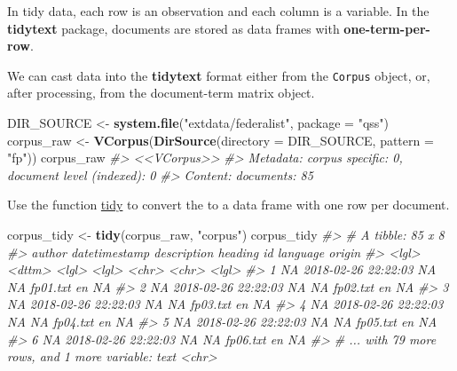 \documentclass[]{book}
\newenvironment{Shaded}{\begin{snugshade}}{\end{snugshade}}
\newcommand{\CommentTok}[1]{\textcolor[rgb]{0.56,0.35,0.01}{\textit{#1}}}
\newcommand{\DataTypeTok}[1]{\textcolor[rgb]{0.13,0.29,0.53}{#1}}
\newcommand{\KeywordTok}[1]{\textcolor[rgb]{0.13,0.29,0.53}{\textbf{#1}}}
\newcommand{\NormalTok}[1]{#1}
\newcommand{\StringTok}[1]{\textcolor[rgb]{0.31,0.60,0.02}{#1}}
\theoremstyle{definition}
\theoremstyle{definition}
\theoremstyle{definition}
\theoremstyle{remark}
\begin{document}
In tidy data, each row is an observation and each column is a variable.
In the \textbf{tidytext} package, documents are stored as data frames
with \textbf{one-term-per-row}.

We can cast data into the \textbf{tidytext} format either from the
\texttt{Corpus} object, or, after processing, from the document-term
matrix object.

\begin{Shaded}
\begin{Highlighting}[]
\NormalTok{DIR_SOURCE <-}\StringTok{ }\KeywordTok{system.file}\NormalTok{(}\StringTok{"extdata/federalist"}\NormalTok{, }\DataTypeTok{package =} \StringTok{"qss"}\NormalTok{)}
\NormalTok{corpus_raw <-}\StringTok{ }\KeywordTok{VCorpus}\NormalTok{(}\KeywordTok{DirSource}\NormalTok{(}\DataTypeTok{directory =}\NormalTok{ DIR_SOURCE, }\DataTypeTok{pattern =} \StringTok{"fp"}\NormalTok{))}
\NormalTok{corpus_raw}
\CommentTok{#> <<VCorpus>>}
\CommentTok{#> Metadata:  corpus specific: 0, document level (indexed): 0}
\CommentTok{#> Content:  documents: 85}
\end{Highlighting}
\end{Shaded}

Use the function
\href{https://www.rdocumentation.org/packages/tidyytext/topics/tidy.Corpus}{tidy}
to convert the to a data frame with one row per document.

\begin{Shaded}
\begin{Highlighting}[]
\NormalTok{corpus_tidy <-}\StringTok{ }\KeywordTok{tidy}\NormalTok{(corpus_raw, }\StringTok{"corpus"}\NormalTok{)}
\NormalTok{corpus_tidy}
\CommentTok{#> # A tibble: 85 x 8}
\CommentTok{#>   author datetimestamp       description heading id       language origin}
\CommentTok{#>   <lgl>  <dttm>              <lgl>       <lgl>   <chr>    <chr>    <lgl> }
\CommentTok{#> 1 NA     2018-02-26 22:22:03 NA          NA      fp01.txt en       NA    }
\CommentTok{#> 2 NA     2018-02-26 22:22:03 NA          NA      fp02.txt en       NA    }
\CommentTok{#> 3 NA     2018-02-26 22:22:03 NA          NA      fp03.txt en       NA    }
\CommentTok{#> 4 NA     2018-02-26 22:22:03 NA          NA      fp04.txt en       NA    }
\CommentTok{#> 5 NA     2018-02-26 22:22:03 NA          NA      fp05.txt en       NA    }
\CommentTok{#> 6 NA     2018-02-26 22:22:03 NA          NA      fp06.txt en       NA    }
\CommentTok{#> # ... with 79 more rows, and 1 more variable: text <chr>}
\end{Highlighting}
\end{Shaded}
\end{document}
